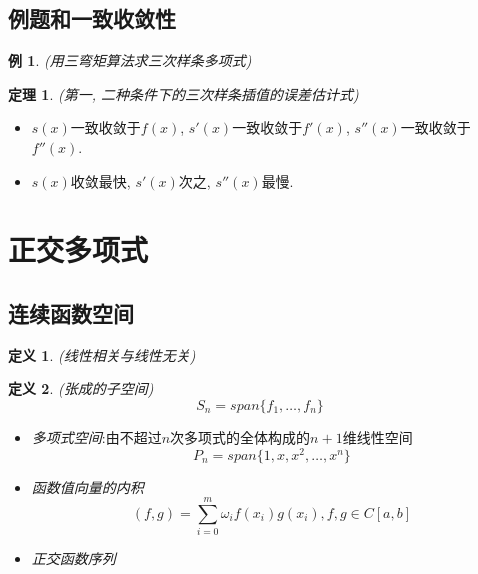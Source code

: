\documentclass[twoside]{article}
\newtheorem{theorem}{定理}[section]
\newtheorem{definition}{定义}[section]
\newtheorem{eg}{例}[section]
\begin{document}
\subsection{例题和一致收敛性}
\begin{eg}
  (用三弯矩算法求三次样条多项式)
\end{eg}
\begin{theorem}
  (第一, 二种条件下的三次样条插值的误差估计式)
  \end{theorem}
\begin{itemize}
  \item $s(x)$一致收敛于$f(x)$, $s'(x)$一致收敛于$f'(x)$, $s''(x)$一致收敛于$f''(x)$.
  \item $s(x)$收敛最快, $s'(x)$次之, $s''(x)$最慢.
\end{itemize}

\section{正交多项式}
\subsection{连续函数空间}
\begin{definition}
  (线性相关与线性无关)
\end{definition}
\begin{definition}
  (张成的子空间)
  \begin{equation}
    S_n = span\{f_1, \ldots, f_n\}
  \end{equation}
\end{definition}
\begin{itemize}
  \item \textit{多项式空间}:由不超过$n$次多项式的全体构成的$n+1$维线性空间
    \begin{equation}
      P_n = span\{1,x,x^2,\ldots, x^n\}
    \end{equation}
  \item \textit{函数值向量的内积}
    \begin{equation}
      (f,g) = \sum^m_{i=0} \omega_i f(x_i) g(x_i), f,g\in C[a,b]
    \end{equation}
  \item \textit{正交函数序列}
\end{itemize}
\end{document}
